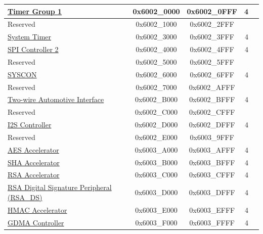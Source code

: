 \begin{longtable}[c]{ |p{5cm}|c|c|r|p{1.0cm}| }
                        \hyperref[mod:timg]{Timer Group 1}               & 0x6002\_0000 & 0x6002\_0FFF &   4     &   \\\hline
    \rowcolor{gray!25}  Reserved                    & 0x6002\_1000 & 0x6002\_2FFF &         &   \\\hline
                        \hyperref[mod:systimer]{System Timer}                & 0x6002\_3000 & 0x6002\_3FFF &   4     &   \\\hline
                        \hyperref[mod:spi]{SPI Controller 2}            & 0x6002\_4000 & 0x6002\_4FFF &   4     &   \\\hline
    \rowcolor{gray!25}  Reserved                    & 0x6002\_5000 & 0x6002\_5FFF &         &   \\\hline
                        \hyperref[mod:permctrl]{SYSCON}              & 0x6002\_6000 & 0x6002\_6FFF &   4     &   \\\hline
    \rowcolor{gray!25}  Reserved                    & 0x6002\_7000 & 0x6002\_AFFF &         &   \\\hline
                    \hyperref[mod:twai]{Two-wire Automotive Interface}   & 0x6002\_B000 & 0x6002\_BFFF &   4     &   \\\hline
    \rowcolor{gray!25}  Reserved                    & 0x6002\_C000 & 0x6002\_CFFF &         &   \\\hline
                        \hyperref[mod:i2s]{I2S Controller}              & 0x6002\_D000 & 0x6002\_DFFF &   4     &   \\\hline
    \rowcolor{gray!25}  Reserved                    & 0x6002\_E000 & 0x6003\_9FFF &         &   \\\hline

                        \hyperref[mod:aes]{AES Accelerator}             & 0x6003\_A000 & 0x6003\_AFFF &   4    &   \\\hline
                        \hyperref[mod:sha]{SHA Accelerator}             & 0x6003\_B000 & 0x6003\_BFFF &   4    &   \\\hline
                        \hyperref[mod:rsa]{RSA Accelerator}             & 0x6003\_C000 & 0x6003\_CFFF &   4    &   \\\hline
                        \hyperref[mod:digsig]{RSA Digital Signature Peripheral (RSA\_DS)}           & 0x6003\_D000 & 0x6003\_DFFF &   4    &   \\\hline
                        \hyperref[mod:hmac]{HMAC Accelerator}            & 0x6003\_E000 & 0x6003\_EFFF &   4    &   \\\hline
                        \hyperref[mod:dma]{GDMA Controller}             & 0x6003\_F000 & 0x6003\_FFFF &   4    &   \\\hline


\end{longtable}
